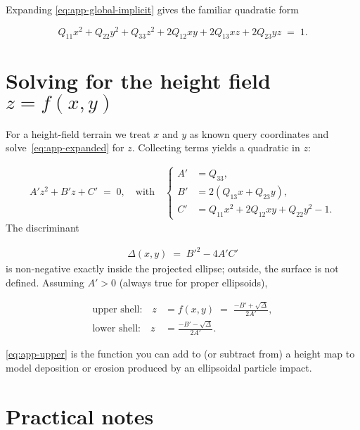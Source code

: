 Expanding \cref{eq:app-global-implicit} gives the familiar quadratic form

\begin{equation}
    \label{eq:app-expanded}
    Q_{11}x^{2} + Q_{22}y^{2} + Q_{33}z^{2}
    + 2Q_{12}xy + 2Q_{13}xz + 2Q_{23}yz \;=\; 1.
\end{equation}

\section{Solving for the height field $z=f(x,y)$}
For a height-field terrain we treat $x$ and $y$ as known query coordinates and solve~\eqref{eq:app-expanded} for $z$. Collecting terms yields a quadratic in $z$:

\begin{align}
    A' z^{2} + B' z + C' \;=\; 0,
    \quad\text{with}\quad
    \begin{cases}
        A' &= Q_{33},\\
        B' &= 2\left(Q_{13}x + Q_{23}y\right),\\
        C' &= Q_{11}x^{2} + 2Q_{12}xy + Q_{22}y^{2} - 1.
    \end{cases}
    \label{eq:app-quadratic-coeffs}
\end{align}
The discriminant

\begin{align}
    \Delta(x,y) \;=\; B'^{2} - 4A'C'
\end{align}
is non-negative exactly inside the projected ellipse; outside, the surface is not defined.  Assuming $A'>0$ (always true for proper ellipsoids),

\begin{align}
    \text{upper shell:}\quad
    z &= f(x,y)
    \;=\;
    \frac{-B' + \sqrt{\Delta}}{2A'},
    \label{eq:app-upper}\\[4pt]
    \text{lower shell:}\quad
    z &= \frac{-B' - \sqrt{\Delta}}{2A'}.
    \label{eq:app-lower}
\end{align}

\cref{eq:app-upper} is the function you can add to (or subtract from) a height map to model deposition or erosion produced by an ellipsoidal particle impact.

\section{Practical notes}

